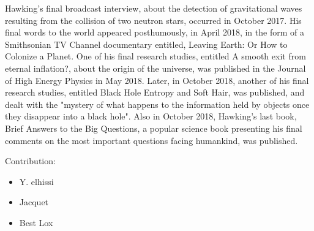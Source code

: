 \documentclass[11pt]{report}
\begin{document}
Hawking's final broadcast interview, about the detection of gravitational waves resulting from the collision of two neutron stars, occurred in October 2017. His final words to the world appeared posthumously, in April 2018, in the form of a Smithsonian TV Channel documentary entitled, Leaving Earth: Or How to Colonize a Planet. One of his final research studies, entitled A smooth exit from eternal inflation?, about the origin of the universe, was published in the Journal of High Energy Physics in May 2018. Later, in October 2018, another of his final research studies, entitled Black Hole Entropy and Soft Hair, was published, and dealt with the "mystery of what happens to the information held by objects once they disappear into a black hole". Also in October 2018, Hawking's last book, Brief Answers to the Big Questions, a popular science book presenting his final comments on the most important questions facing humankind, was published.


\pagebreak
Contribution: 
\begin{itemize}
\item Y. elhissi
\item Jacquet
\item Best Lox
\end{itemize}
\end{document}
